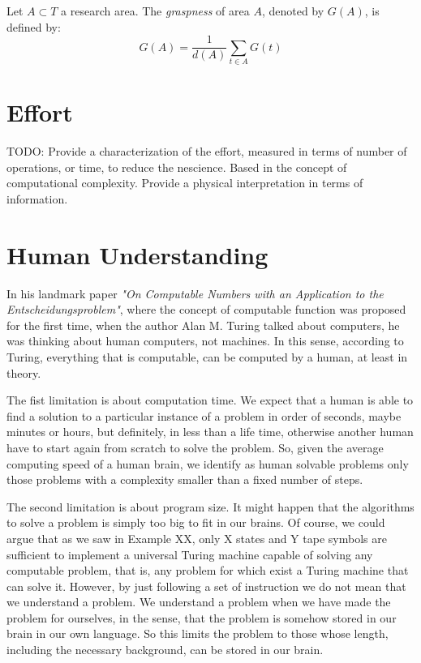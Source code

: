 \begin{definition}
Let $A \subset T$ a research area. The \emph{graspness} of area $A$, denoted by $G(A)$, is defined by:
\[
G(A) = \frac{1}{d(A)} \sum_{t \in A} G(t)
\]
\end{definition}

%
%
\section{Effort}

{\color{red} TODO: Provide a characterization of the effort, measured in terms of number of operations, or time, to reduce the nescience. Based in the concept of computational complexity. Provide a physical interpretation in terms of information.}

%
%
\section{Human Understanding}

In his landmark paper \emph{"On Computable Numbers with an Application to the Entscheidungsproblem"}, where the concept of computable function was proposed for the first time, when the author Alan M. Turing talked about computers, he was thinking about human computers, not machines. In this sense, according to Turing, everything that is computable, can be computed by a human, at least in theory.

The fist limitation is about computation time. We expect that a human is able to find a solution to a particular instance of a problem in order of seconds, maybe minutes or hours, but definitely, in less than a life time, otherwise another human have to start again from scratch to solve the problem. So, given the average computing speed of a human brain, we identify as human solvable problems only those problems with a complexity smaller than a fixed number of steps.

The second limitation is about program size. It might happen that the algorithms to solve a problem is simply too big to fit in our brains. Of course, we could argue that {\color{red} as we saw in Example XX, only X states and Y tape symbols} are sufficient to implement a universal Turing machine capable of solving any computable problem, that is, any problem for which exist a Turing machine that can solve it. However, by just following a set of instruction we do not mean that we understand a problem. We understand a problem when we have made the problem for ourselves, in the sense, that the problem is somehow stored in our brain in our own language. So this limits the problem to those whose length, including the necessary background, can be stored in our brain.

